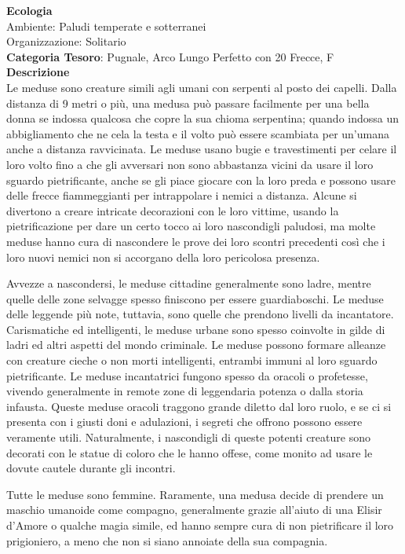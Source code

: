 \begin{multicols}{2}
{\textbf{Ecologia}\\
Ambiente: Paludi temperate e sotterranei\\
Organizzazione: Solitario\\
\textbf{Categoria Tesoro}: Pugnale, Arco Lungo Perfetto con 20 Frecce, F\\
\textbf{Descrizione}\\
Le meduse sono creature simili agli umani con serpenti al posto dei capelli. Dalla distanza di 9 metri o più, una medusa può passare facilmente per una bella donna se indossa qualcosa che copre la sua chioma serpentina; quando indossa un abbigliamento che ne cela la testa e il volto può essere scambiata per un'umana anche a distanza ravvicinata. Le meduse usano bugie e travestimenti per celare il loro volto fino a che gli avversari non sono abbastanza vicini da usare il loro sguardo pietrificante, anche se gli piace giocare con la loro preda e possono usare delle frecce fiammeggianti per intrappolare i nemici a distanza. Alcune si divertono a creare intricate decorazioni con le loro vittime, usando la pietrificazione per dare un certo tocco ai loro nascondigli paludosi, ma molte meduse hanno cura di nascondere le prove dei loro scontri precedenti così che i loro nuovi nemici non si accorgano della loro pericolosa presenza.

Avvezze a nascondersi, le meduse cittadine generalmente sono ladre, mentre quelle delle zone selvagge spesso finiscono per essere guardiaboschi. Le meduse delle leggende più note, tuttavia, sono quelle che prendono livelli da incantatore. Carismatiche ed intelligenti, le meduse urbane sono spesso coinvolte in gilde di ladri ed altri aspetti del mondo criminale. Le meduse possono formare alleanze con creature cieche o non morti intelligenti, entrambi immuni al loro sguardo pietrificante. Le meduse incantatrici fungono spesso da oracoli o profetesse, vivendo generalmente in remote zone di leggendaria potenza o dalla storia infausta. Queste meduse oracoli traggono grande diletto dal loro ruolo, e se ci si presenta con i giusti doni e adulazioni, i segreti che offrono possono essere veramente utili. Naturalmente, i nascondigli di queste potenti creature sono decorati con le statue di coloro che le hanno offese, come monito ad usare le dovute cautele durante gli incontri.

Tutte le meduse sono femmine. Raramente, una medusa decide di prendere un maschio umanoide come compagno, generalmente grazie all'aiuto di una Elisir d'Amore o qualche magia simile, ed hanno sempre cura di non pietrificare il loro prigioniero, a meno che non si siano annoiate della sua compagnia.

}
\end{multicols}
